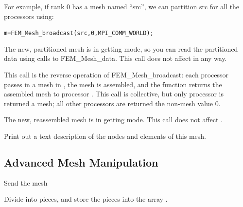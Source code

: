 For example, if rank 0 has a mesh named ``src'', we can 
partition src for all the processors using:
\begin{alltt}
  m=FEM_Mesh_broadcast(src,0,MPI_COMM_WORLD);
\end{alltt}

The new, partitioned mesh is in getting mode, so 
you can read the partitioned data using calls to FEM\_Mesh\_data.
This call does not affect  in any way.

  

This call is the reverse operation of FEM\_Mesh\_broadcast:
each processor passes in a mesh in , the mesh is 
assembled, and the function returns the assembled mesh
to processor .  This call is collective, but 
only processor  is returned a mesh; all other
processors are returned the non-mesh value 0.

The new, reassembled mesh is in getting mode.
This call does not affect .



Print out a text description of the nodes and elements 
of this mesh.



\subsection{Advanced Mesh Manipulation}

  Send the mesh  
  
  


Divide  into  pieces, and store the pieces
into the array . 

